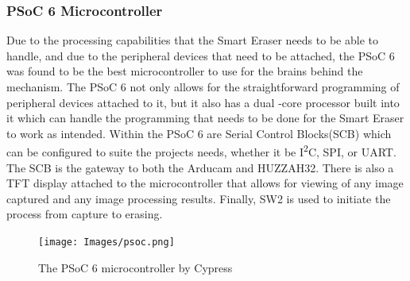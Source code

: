  \subsubsection{PSoC 6 Microcontroller}
 Due to the processing capabilities that the Smart Eraser needs to be able to handle, and due to the peripheral devices that need to be attached, the PSoC 6 was found to be the best microcontroller to use for the brains behind the mechanism. The PSoC 6 not only allows for the straightforward programming of peripheral devices attached to it, but it also has a dual -core processor built into it which can handle the programming that needs to be done for the Smart Eraser to work as intended. Within the PSoC 6 are Serial Control Blocks(SCB) which can be configured to suite the projects needs, whether it be I\textsuperscript{2}C, SPI, or UART. The SCB is the gateway to both the Arducam and HUZZAH32. There is also a TFT display attached to the microcontroller that allows for viewing of any image captured and any image processing results. Finally, SW2 is used to initiate the process from capture to erasing.
    \begin{figure}[H]
 	\centering
 	{\texttt{[image: Images/psoc.png]}}
 	\caption{The PSoC 6 microcontroller by Cypress}
 	\label{fig:psoc}
 \end{figure}
 
